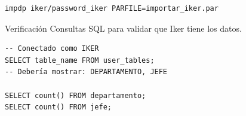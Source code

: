 \documentclass[11pt]{article}
\begin{document}
\begin{verbatim}
impdp iker/password_iker PARFILE=importar_iker.par
\end{verbatim}

Verificación
Consultas SQL para validar que Iker tiene los datos.

\begin{verbatim}
-- Conectado como IKER
SELECT table_name FROM user_tables;
-- Debería mostrar: DEPARTAMENTO, JEFE

SELECT count() FROM departamento;
SELECT count() FROM jefe;
\end{verbatim}
\end{document}
